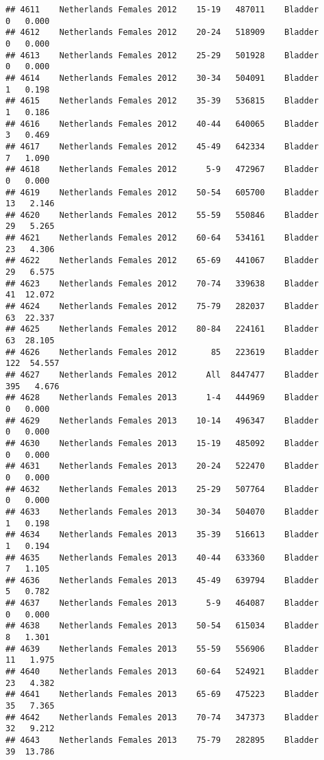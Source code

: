 \documentclass[
]{article}
\begin{document}
\begin{verbatim}
## 4611    Netherlands Females 2012    15-19   487011    Bladder      0   0.000
## 4612    Netherlands Females 2012    20-24   518909    Bladder      0   0.000
## 4613    Netherlands Females 2012    25-29   501928    Bladder      0   0.000
## 4614    Netherlands Females 2012    30-34   504091    Bladder      1   0.198
## 4615    Netherlands Females 2012    35-39   536815    Bladder      1   0.186
## 4616    Netherlands Females 2012    40-44   640065    Bladder      3   0.469
## 4617    Netherlands Females 2012    45-49   642334    Bladder      7   1.090
## 4618    Netherlands Females 2012      5-9   472967    Bladder      0   0.000
## 4619    Netherlands Females 2012    50-54   605700    Bladder     13   2.146
## 4620    Netherlands Females 2012    55-59   550846    Bladder     29   5.265
## 4621    Netherlands Females 2012    60-64   534161    Bladder     23   4.306
## 4622    Netherlands Females 2012    65-69   441067    Bladder     29   6.575
## 4623    Netherlands Females 2012    70-74   339638    Bladder     41  12.072
## 4624    Netherlands Females 2012    75-79   282037    Bladder     63  22.337
## 4625    Netherlands Females 2012    80-84   224161    Bladder     63  28.105
## 4626    Netherlands Females 2012       85   223619    Bladder    122  54.557
## 4627    Netherlands Females 2012      All  8447477    Bladder    395   4.676
## 4628    Netherlands Females 2013      1-4   444969    Bladder      0   0.000
## 4629    Netherlands Females 2013    10-14   496347    Bladder      0   0.000
## 4630    Netherlands Females 2013    15-19   485092    Bladder      0   0.000
## 4631    Netherlands Females 2013    20-24   522470    Bladder      0   0.000
## 4632    Netherlands Females 2013    25-29   507764    Bladder      0   0.000
## 4633    Netherlands Females 2013    30-34   504070    Bladder      1   0.198
## 4634    Netherlands Females 2013    35-39   516613    Bladder      1   0.194
## 4635    Netherlands Females 2013    40-44   633360    Bladder      7   1.105
## 4636    Netherlands Females 2013    45-49   639794    Bladder      5   0.782
## 4637    Netherlands Females 2013      5-9   464087    Bladder      0   0.000
## 4638    Netherlands Females 2013    50-54   615034    Bladder      8   1.301
## 4639    Netherlands Females 2013    55-59   556906    Bladder     11   1.975
## 4640    Netherlands Females 2013    60-64   524921    Bladder     23   4.382
## 4641    Netherlands Females 2013    65-69   475223    Bladder     35   7.365
## 4642    Netherlands Females 2013    70-74   347373    Bladder     32   9.212
## 4643    Netherlands Females 2013    75-79   282895    Bladder     39  13.786

\end{verbatim}
\end{document}
